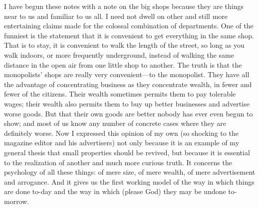 \documentclass{book}
\begin{document}
I have begun these notes with a note on the big shops because they are things near to us and familiar to us all. I need not dwell on other and still more entertaining claims made for the colossal combination of departments. One of the funniest is the statement that it is convenient to get everything in the same shop. That is to stay, it is convenient to walk the length of the street, so long as you walk indoors, or more frequently underground, instead of walking the same distance in the open air from one little shop to another. The truth is that the monopolists’ shops are really very convenient—to the monopolist. They have all the advantage of concentrating business as they concentrate wealth, in fewer and fewer of the citizens. Their wealth sometimes permits them to pay tolerable wages; their wealth also permits them to buy up better businesses and advertise worse goods. But that their own goods are better nobody has ever even begun to show; and most of us know any number of concrete cases where they are definitely worse. Now I expressed this opinion of my own (so shocking to the magazine editor and his advertisers) not only because it is an example of my general thesis that small properties should be revived, but because it is essential to the realization of another and much more curious truth. It concerns the psychology of all these things: of mere size, of mere wealth, of mere advertisement and arrogance. And it gives us the first working model of the way in which things are done to-day and the way in which (please God) they may be undone to-morrow.
\end{document}
